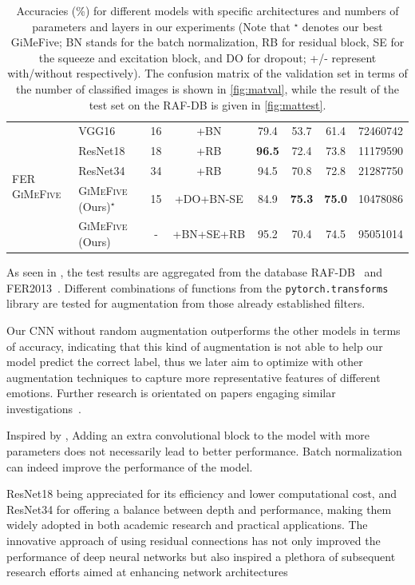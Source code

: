 \begin{table}[ht]
\begin{tabular}{@{}llcccccr@{}}
    \midrule
    \midrule
    \multirow{5}{*}{FER \textsc{GiMeFive}} & VGG16~\cite{SimonyanZ14a} & 16 & +BN & 79.4 & 53.7 & 61.4 & 72460742 \\
    & ResNet18~\cite{HeZRS16} & 18 & +RB  & \textbf{96.5} & 72.4 & 73.8 & 11179590 \\
    & ResNet34~\cite{HeZRS16} & 34 & +RB  & 94.5 & 70.8 & 72.8 & 21287750 \\
    &\textsc{GiMeFive} (Ours)\textcolor{LMUGreen}{$^\star$} & 15 & +DO+BN-SE & 84.9 & \textbf{75.3} & \textbf{75.0} & 10478086 \\
    &\textsc{GiMeFive} (Ours) & - & +BN+SE+RB & 95.2 & 70.4 & 74.5 & 95051014 \\
    \bottomrule
  \end{tabular}
  \caption{Accuracies (\%) for different models with specific architectures and numbers of parameters and layers in our experiments 
  (Note that \textcolor{LMUGreen}{$^\star$} denotes our best GiMeFive; 
  BN stands for the batch normalization, 
  RB for residual block, 
  SE for the squeeze and excitation block, 
  and DO for dropout; 
  +/- represent with/without respectively). 
  The confusion matrix of the validation set in terms of the number of classified images is shown in \cref{fig:matval}, 
  while the result of the test set on the RAF-DB is given in \cref{fig:mattest}.} 
  \label{tab:model}
\end{table}

As seen in , 
the test results are aggregated from the database RAF-DB~\cite{kaggle_rafdb} and FER2013~\cite{kaggle_fer}.
Different combinations of functions from the \texttt{pytorch.transforms} library are tested for augmentation from those already established filters. 

Our CNN without random augmentation outperforms the other models in terms of accuracy, 
indicating that this kind of augmentation is not able to help our model predict the correct label, 
thus we later aim to optimize with other augmentation techniques to capture more representative features of different emotions.
Further research is orientated on papers engaging similar investigations~\cite{ZeilerF14,li_reliable_2017,VermaMRMV23}.

Inspired by \citet{SimonyanZ14a}, 
Adding an extra convolutional block to the model with more parameters does not necessarily lead to better performance.
Batch normalization can indeed improve the performance of the model. 

ResNet18 being appreciated for its efficiency and lower computational cost, 
and ResNet34 for offering a balance between depth and performance, 
making them widely adopted in both academic research and practical applications. 
The innovative approach of using residual connections has not only improved the performance of deep neural networks 
but also inspired a plethora of subsequent research efforts aimed at enhancing network architectures


